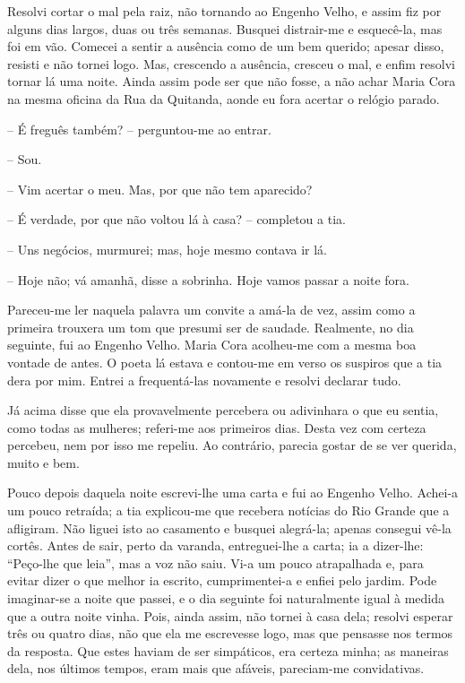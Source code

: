 Resolvi cortar o mal pela raiz, não tornando ao Engenho Velho, e assim
fiz por alguns dias largos, duas ou três semanas. Busquei distrair-me e
esquecê-la, mas foi em vão. Comecei a sentir a ausência como de um bem
querido; apesar disso, resisti e não tornei logo. Mas, crescendo a
ausência, cresceu o mal, e enfim resolvi tornar lá uma noite. Ainda
assim pode ser que não fosse, a não achar Maria Cora na mesma oficina da
Rua da Quitanda, aonde eu fora acertar o relógio parado.

-- É freguês também? -- perguntou-me ao entrar.

-- Sou.

-- Vim acertar o meu. Mas, por que não tem aparecido?

-- É verdade, por que não voltou lá à casa? -- completou a tia.

-- Uns negócios, murmurei; mas, hoje mesmo contava ir lá.

-- Hoje não; vá amanhã, disse a sobrinha. Hoje vamos passar a noite
fora.

Pareceu-me ler naquela palavra um convite a amá-la de vez, assim como a
primeira trouxera um tom que presumi ser de saudade. Realmente, no dia
seguinte, fui ao Engenho Velho. Maria Cora acolheu-me com a mesma boa
vontade de antes. O poeta lá estava e contou-me em verso os suspiros que
a tia dera por mim. Entrei a frequentá-las novamente e resolvi declarar
tudo.

Já acima disse que ela provavelmente percebera ou adivinhara o que eu
sentia, como todas as mulheres; referi-me aos primeiros dias. Desta vez
com certeza percebeu, nem por isso me repeliu. Ao contrário, parecia
gostar de se ver querida, muito e bem.

Pouco depois daquela noite escrevi-lhe uma carta e fui ao Engenho Velho.
Achei-a um pouco retraída; a tia explicou-me que recebera notícias do
Rio Grande que a afligiram. Não liguei isto ao casamento e busquei
alegrá-la; apenas consegui vê-la cortês. Antes de sair, perto da
varanda, entreguei-lhe a carta; ia a dizer-lhe: ``Peço-lhe que leia'',
mas a voz não saiu. Vi-a um pouco atrapalhada e, para evitar dizer o que
melhor ia escrito, cumprimentei-a e enfiei pelo jardim. Pode imaginar-se
a noite que passei, e o dia seguinte foi naturalmente igual à medida que
a outra noite vinha. Pois, ainda assim, não tornei à casa dela; resolvi
esperar três ou quatro dias, não que ela me escrevesse logo, mas que
pensasse nos termos da resposta. Que estes haviam de ser simpáticos, era
certeza minha; as maneiras dela, nos últimos tempos, eram mais que
afáveis, pareciam-me convidativas.

